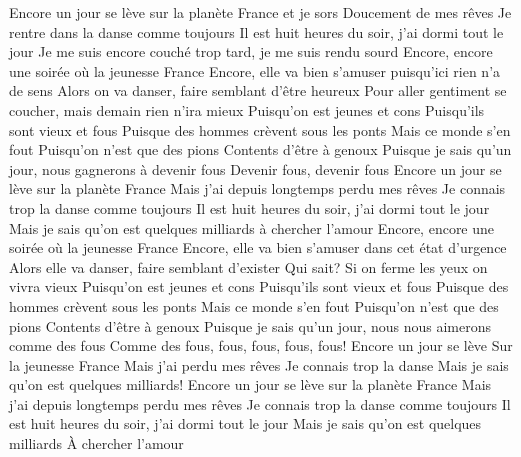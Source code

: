 

Encore un jour se lève sur la planète France et je sors
Doucement de mes rêves
Je rentre dans la danse comme toujours
Il est huit heures du soir, j'ai dormi tout le jour
Je me suis encore couché trop tard, je me suis rendu sourd
Encore, encore une soirée où la jeunesse France
Encore, elle va bien s'amuser puisqu'ici rien n'a de sens
Alors on va danser, faire semblant d'être heureux
Pour aller gentiment se coucher, mais demain rien n'ira mieux
Puisqu'on est jeunes et cons
Puisqu'ils sont vieux et fous
Puisque des hommes crèvent sous les ponts
Mais ce monde s'en fout
Puisqu'on n'est que des pions
Contents d'être à genoux
Puisque je sais qu'un jour, nous gagnerons à devenir fous
Devenir fous, devenir fous
Encore un jour se lève sur la planète France
Mais j'ai depuis longtemps perdu mes rêves
Je connais trop la danse comme toujours
Il est huit heures du soir, j'ai dormi tout le jour
Mais je sais qu'on est quelques milliards à chercher l'amour
Encore, encore une soirée où la jeunesse France
Encore, elle va bien s'amuser dans cet état d'urgence
Alors elle va danser, faire semblant d'exister
Qui sait? Si on ferme les yeux on vivra vieux
Puisqu'on est jeunes et cons
Puisqu'ils sont vieux et fous
Puisque des hommes crèvent sous les ponts
Mais ce monde s'en fout
Puisqu'on n'est que des pions
Contents d'être à genoux
Puisque je sais qu'un jour, nous nous aimerons comme des fous
Comme des fous, fous, fous, fous, fous!
Encore un jour se lève
Sur la jeunesse France
Mais j'ai perdu mes rêves
Je connais trop la danse
Mais je sais qu'on est quelques milliards!
Encore un jour se lève sur la planète France
Mais j'ai depuis longtemps perdu mes rêves
Je connais trop la danse comme toujours
Il est huit heures du soir, j'ai dormi tout le jour
Mais je sais qu'on est quelques milliards
À chercher l'amour